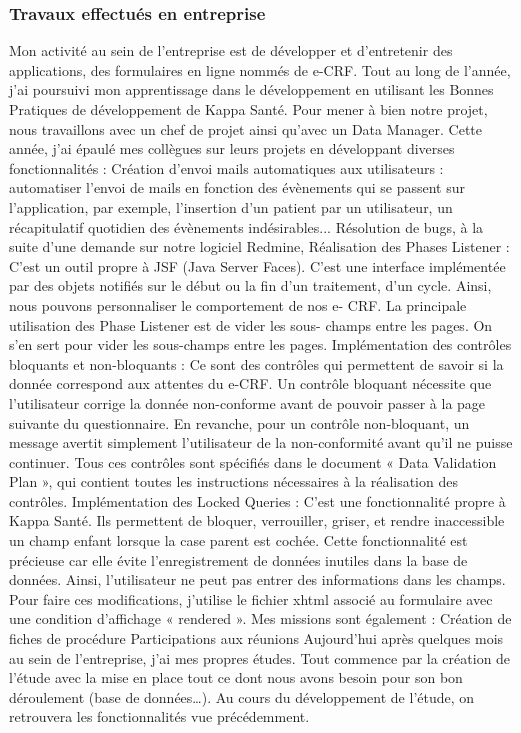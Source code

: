 \subsubsection{Travaux effectués en entreprise}
Mon activité au sein de l’entreprise est de développer et d’entretenir des
applications, des
formulaires en ligne nommés de e-CRF.
Tout au long de l’année, j’ai poursuivi mon apprentissage dans le
développement en utilisant les Bonnes Pratiques de développement de Kappa
Santé.
Pour mener à bien notre projet, nous travaillons avec un chef de projet ainsi
qu’avec un Data Manager.
Cette année, j’ai épaulé mes collègues sur leurs projets en développant
diverses fonctionnalités :
Création d’envoi mails automatiques aux utilisateurs : automatiser l’envoi
de mails en fonction des évènements qui se passent sur l’application, par
exemple, l’insertion d’un
patient par un utilisateur, un récapitulatif quotidien des évènements
indésirables...
Résolution de bugs, à la suite d’une demande sur notre logiciel Redmine,
Réalisation des Phases Listener : C’est un outil propre à JSF (Java Server
Faces). C’est une interface implémentée par des objets notifiés sur le début
ou la fin d’un traitement,
d’un cycle. Ainsi, nous pouvons personnaliser le comportement de nos e-
CRF. La principale utilisation des Phase Listener est de vider les sous-
champs entre les pages. On s’en sert pour vider les sous-champs entre les
pages.
Implémentation des contrôles bloquants et non-bloquants : Ce sont des
contrôles qui permettent de savoir si la donnée correspond aux attentes du
e-CRF. Un contrôle
bloquant nécessite que l’utilisateur corrige la donnée non-conforme avant
de pouvoir passer à la page suivante du questionnaire. En revanche, pour
un contrôle non-bloquant, un message avertit simplement l’utilisateur de la
non-conformité avant qu’il ne puisse continuer. Tous ces contrôles sont spécifiés dans le document « Data Validation Plan », qui contient toutes les
instructions nécessaires à la réalisation des contrôles.
Implémentation des Locked Queries : C’est une fonctionnalité propre à
Kappa Santé. Ils permettent de bloquer, verrouiller, griser, et rendre
inaccessible un champ enfant
lorsque la case parent est cochée. Cette fonctionnalité est précieuse car
elle évite l’enregistrement de données inutiles dans la base de données.
Ainsi, l’utilisateur ne peut
pas entrer des informations dans les champs. Pour faire ces modifications,
j’utilise le fichier xhtml associé au formulaire avec une condition d’affichage
« rendered ».
Mes missions sont également :
Création de fiches de procédure
Participations aux réunions
Aujourd’hui après quelques mois au sein de l’entreprise, j’ai mes propres
études. Tout commence par la création de l’étude avec la mise en place tout ce
dont nous avons besoin pour son bon déroulement (base de données…). Au
cours du développement de l’étude, on retrouvera les fonctionnalités vue
précédemment.

